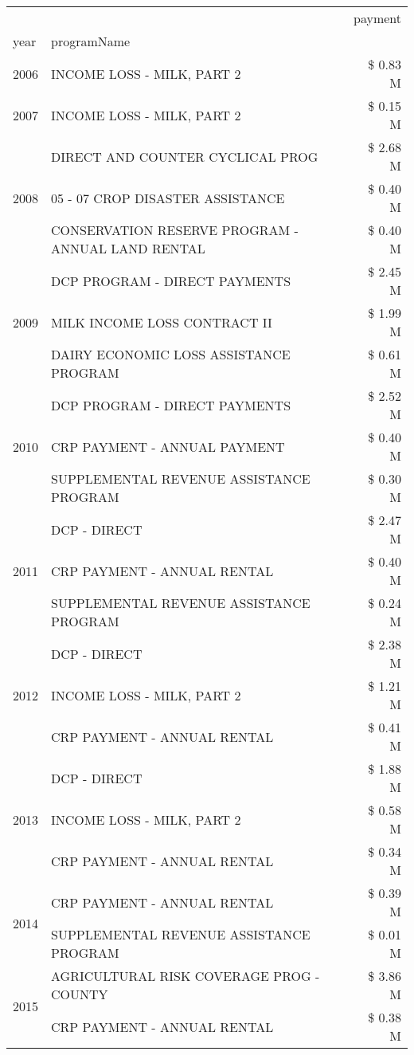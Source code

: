 \begin{tabular}{llr}
\toprule
 &  & payment \\
year & programName &  \\
\midrule
2006 & INCOME LOSS - MILK, PART 2 & \$ 0.83 M \\
\cline{1-3}
2007 & INCOME LOSS - MILK, PART 2 & \$ 0.15 M \\
\cline{1-3}
\multirow[t]{3}{*}{2008} & DIRECT AND COUNTER CYCLICAL PROG & \$ 2.68 M \\
 & 05 - 07 CROP DISASTER ASSISTANCE & \$ 0.40 M \\
 & CONSERVATION RESERVE PROGRAM - ANNUAL LAND RENTAL & \$ 0.40 M \\
\cline{1-3}
\multirow[t]{3}{*}{2009} & DCP PROGRAM - DIRECT PAYMENTS & \$ 2.45 M \\
 & MILK INCOME LOSS CONTRACT II & \$ 1.99 M \\
 & DAIRY ECONOMIC LOSS ASSISTANCE PROGRAM & \$ 0.61 M \\
\cline{1-3}
\multirow[t]{3}{*}{2010} & DCP PROGRAM - DIRECT PAYMENTS & \$ 2.52 M \\
 & CRP PAYMENT - ANNUAL PAYMENT & \$ 0.40 M \\
 & SUPPLEMENTAL REVENUE ASSISTANCE PROGRAM & \$ 0.30 M \\
\cline{1-3}
\multirow[t]{3}{*}{2011} & DCP - DIRECT & \$ 2.47 M \\
 & CRP PAYMENT - ANNUAL RENTAL & \$ 0.40 M \\
 & SUPPLEMENTAL REVENUE ASSISTANCE PROGRAM & \$ 0.24 M \\
\cline{1-3}
\multirow[t]{3}{*}{2012} & DCP - DIRECT & \$ 2.38 M \\
 & INCOME LOSS - MILK, PART 2 & \$ 1.21 M \\
 & CRP PAYMENT - ANNUAL RENTAL & \$ 0.41 M \\
\cline{1-3}
\multirow[t]{3}{*}{2013} & DCP - DIRECT & \$ 1.88 M \\
 & INCOME LOSS - MILK, PART 2 & \$ 0.58 M \\
 & CRP PAYMENT - ANNUAL RENTAL & \$ 0.34 M \\
\cline{1-3}
\multirow[t]{2}{*}{2014} & CRP PAYMENT - ANNUAL RENTAL & \$ 0.39 M \\
 & SUPPLEMENTAL REVENUE ASSISTANCE PROGRAM & \$ 0.01 M \\
\cline{1-3}
\multirow[t]{3}{*}{2015} & AGRICULTURAL RISK COVERAGE PROG - COUNTY & \$ 3.86 M \\
 & CRP PAYMENT - ANNUAL RENTAL & \$ 0.38 M \\

\end{tabular}

